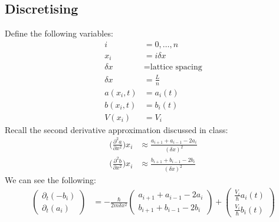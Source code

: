 \documentclass[11pt,letterpaper]{article}
\begin{document}
	\subsection{Discretising}
	Define the following variables:
	\begin{align*}
		i &= 0,\ldots,n\\
		x_i  &=  i\delta x\\
		\delta x &= \text{lattice spacing}\\
		\delta x &= \frac{L}{n}\\
		a(x_i,t) &= a_i(t)\\
		b(x_i,t) &= b_i(t)\\
		V(x_i) &= V_i
	\end{align*}
	Recall the second derivative approximation discussed in class:
	\begin{align*}
		\Big( \frac{\partial^2 a}{\partial x^2} \Big) x_i &\approx \frac{a_{i+1}+a_{i-1}-2a_i}{{(\delta x)}^2}\\
		\Big( \frac{\partial^2 b}{\partial x^2} \Big) x_i &\approx \frac{b_{i+1}+b_{i-1}-2b_i}{{(\delta x)}^2}
	\end{align*}
	We can see the following:
	\begin{align*}
		\begin{pmatrix}
			\partial_t (-b_i)\\
			\partial_t (a_i)
		\end{pmatrix}
		&=
		-\frac{\hbar}{2m \delta x^2}
		\begin{pmatrix}
			a_{i+1}+a_{i-1}-2a_i\\
			b_{i+1}+b_{i-1}-2b_i
		\end{pmatrix}
		+
		\begin{pmatrix}
			\frac{V_i}{\hbar} a_i(t)\\
			\frac{V_i}{\hbar} b_i(t)
		\end{pmatrix}
	\end{align*}
\end{document}
